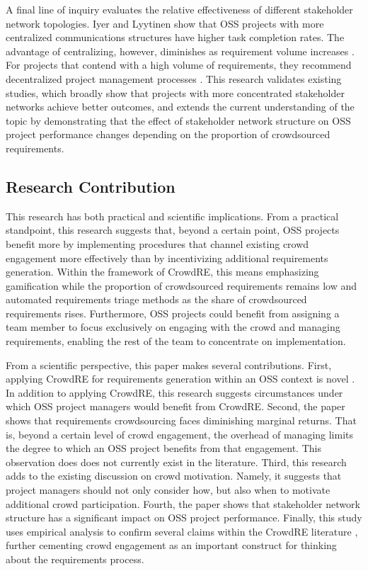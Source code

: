 A final line of inquiry evaluates the relative effectiveness of different stakeholder network topologies. Iyer and Lyytinen \cite{iyer} show that OSS projects with more centralized communications structures have higher task completion rates. The advantage of centralizing, however, diminishes as requirement volume increases \cite{iyer}. For projects that contend with a high volume of requirements, they recommend decentralized project management processes \cite{iyer}. This research validates existing studies, which broadly show that projects with more concentrated stakeholder networks achieve better outcomes, and extends the current understanding of the topic by demonstrating that the effect of stakeholder network structure on OSS project performance changes depending on the proportion of crowdsourced requirements.

\subsection{Research Contribution}
\label{contribution}

This research has both practical and scientific implications. From a practical standpoint, this research suggests that, beyond a certain point, OSS projects benefit more by implementing procedures that channel existing crowd engagement more effectively than by incentivizing additional requirements generation. Within the framework of CrowdRE, this means emphasizing gamification \cite{snijders, snijders2} while the proportion of crowdsourced requirements remains low and automated requirements triage methods \cite{stakesource, mobasher} as the share of crowdsourced requirements rises. Furthermore, OSS projects could benefit from assigning a team member to focus exclusively on engaging with the crowd and managing requirements, enabling the rest of the team to concentrate on implementation.

From a scientific perspective, this paper makes several contributions. First, applying CrowdRE for requirements generation within an OSS context is novel \cite{glinz}. In addition to applying CrowdRE, this research suggests circumstances under which OSS project managers would benefit from CrowdRE. Second, the paper shows that requirements crowdsourcing faces diminishing marginal returns. That is, beyond a certain level of crowd engagement, the overhead of managing limits the degree to which an OSS project benefits from that engagement. This observation does does not currently exist in the literature. Third, this research adds to the existing discussion \cite{groen, levy, hosseini, snijders, snijders2} on crowd motivation. Namely, it suggests that project managers should not only consider how, but also when to motivate additional crowd participation. Fourth, the paper shows that stakeholder network structure has a significant impact on OSS project performance. Finally, this study uses empirical analysis to confirm several claims within the CrowdRE literature \cite{glinz}, further cementing crowd engagement as an important construct for thinking about the requirements process.

